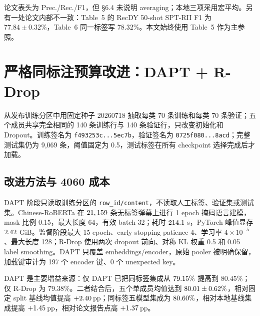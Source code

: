 \documentclass[UTF8,zihao=-4,a4paper]{ctexart}
\newcommand{\pp}{\,pp}
\begin{document}
\begin{warningbox}[指标与论文内部不一致]
论文表头为 Prec./Rec./F1，但 \S6.4 未说明 averaging；本地三项采用宏平均。另有一处论文内部不一致：Table~5 的 RecDY 50-shot SPT-RII F1 为 $77.84\pm0.32\%$，Table~6 同一标签写 78.32\%。本文始终使用 Table~5 作为主参照。
\end{warningbox}

\clearpage
\section{严格同标注预算改进：DAPT + R-Drop}

\begin{infobox}[本轮新增协议]
从发布训练分区中用固定种子 20260718 抽取每类 70 条训练和每类 70 条验证；五个成员共享完全相同的 140 条训练行与 140 条验证行，只改变初始化和 Dropout。训练签名为
\texttt{f493253c...5ec7b}，验证签名为 \texttt{0725f080...8acd}；完整测试集仍为 9,069 条，阈值固定为 0.5，测试标签在所有 checkpoint 选择完成后才加载。
\end{infobox}

\subsection{改进方法与 4060 成本}

DAPT 阶段只读取训练分区的 \texttt{row\_id/content}，不读取人工标签、验证集或测试集。Chinese-RoBERTa 在
$21,159$ 条无标签弹幕上进行 1 epoch 掩码语言建模，mask 比例 0.15，最大长度 64，有效 batch 32；耗时
$214.1$ s，PyTorch 峰值显存 $2.42$ GiB。监督阶段最大 15 epoch、early stopping patience 4、学习率 $4\times10^{-5}$、最大长度 128；R-Drop 使用两次 dropout 前向、对称 KL 权重 0.5 和 0.05 label smoothing。DAPT 只覆盖 embeddings/encoder，原始 pooler 被明确保留，加载键审计为 197 个 encoder 键、0 个 unexpected key。

\begin{table}[H]
\centering
\small
\caption{固定同一标签集的 2$\times$2 消融。单成员 SD 仅表示固定 split 下的初始化/Dropout 波动；集成是单点。``对论文''与``对基线''均为百分点。}
\label{tab:same-budget-factorial}

\end{table}

DAPT 是主要增益来源：仅 DAPT 已把同标签集成从 $79.15\%$ 提高到 $80.45\%$；仅 R-Drop 为 $79.38\%$。二者结合后，五个单成员均值达到
$80.01\pm0.62\%$，相对固定 split 基线均值提高 $+2.40$\pp；同标签五模型集成为 $80.60\%$，相对本地基线集成提高 $+1.45$\pp，相对论文报告点高 $+1.37$\pp。
\end{document}
